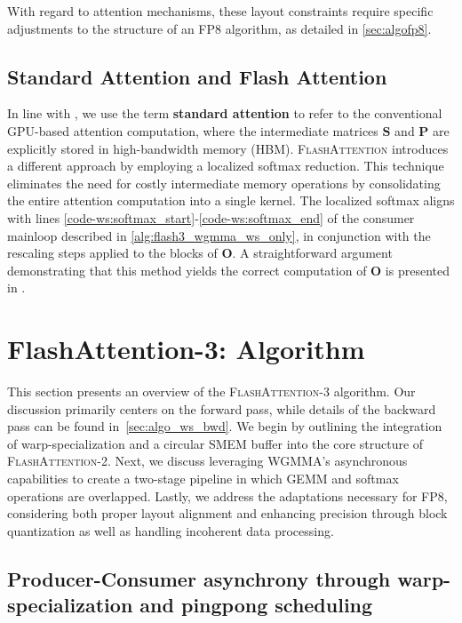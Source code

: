 With regard to attention mechanisms, these layout constraints require specific adjustments to the structure of an FP8 algorithm, as detailed in \cref{sec:algofp8}.

\subsection{Standard Attention and Flash Attention} In line with \citet{dao2022flashattention}, we use the term \textbf{standard attention} to refer to the conventional GPU-based attention computation, where the intermediate matrices $\mathbf{S}$ and $\mathbf{P}$ are explicitly stored in high-bandwidth memory (HBM). \textsc{FlashAttention} introduces a different approach by employing a localized softmax reduction. This technique eliminates the need for costly intermediate memory operations by consolidating the entire attention computation into a single kernel. The localized softmax aligns with lines \ref{code-ws:softmax_start}-\ref{code-ws:softmax_end} of the consumer mainloop described in \cref{alg:flash3_wgmma_ws_only}, in conjunction with the rescaling steps applied to the blocks of $\mathbf{O}$. A straightforward argument demonstrating that this method yields the correct computation of $\mathbf{O}$ is presented in \cite[\S 2.3.1]{dao2023flashattention2}.

\section{FlashAttention-3: Algorithm}
\label{sec:algo}

This section presents an overview of the \textsc{FlashAttention-3} algorithm. Our discussion primarily centers on the forward pass, while details of the backward pass can be found in~\cref{sec:algo_ws_bwd}. We begin by outlining the integration of warp-specialization and a circular SMEM buffer into the core structure of \textsc{FlashAttention-2}. Next, we discuss leveraging WGMMA's asynchronous capabilities to create a two-stage pipeline in which GEMM and softmax operations are overlapped. Lastly, we address the adaptations necessary for FP8, considering both proper layout alignment and enhancing precision through block quantization as well as handling incoherent data processing.

\subsection{Producer-Consumer asynchrony through warp-specialization and pingpong scheduling}
\label{sec:algo_ws}

